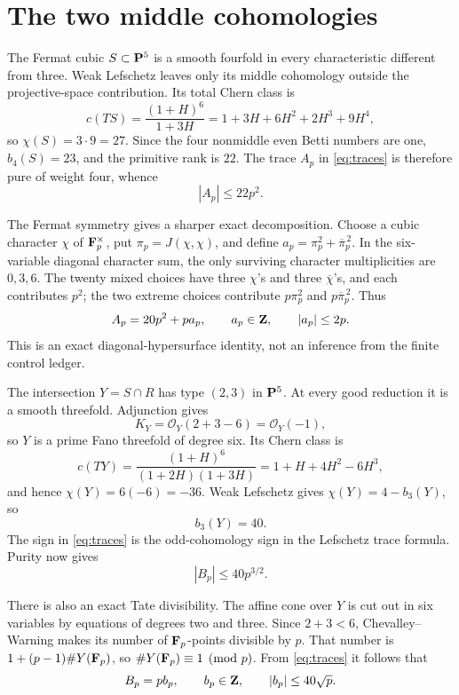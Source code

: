 \section{The two middle cohomologies}

The Fermat cubic \(S\subset\mathbf P^5\) is a smooth fourfold in every
characteristic different from three.  Weak Lefschetz leaves only its middle
cohomology outside the projective-space contribution.  Its total Chern class
is
\[
 c(TS)=\frac{(1+H)^6}{1+3H}
 =1+3H+6H^2+2H^3+9H^4,
\]
so \(\chi(S)=3\cdot9=27\).  Since the four nonmiddle even Betti numbers are
one, \(b_4(S)=23\), and the primitive rank is \(22\).  The trace \(A_p\) in
\cref{eq:traces} is therefore pure of weight four, whence
\begin{equation}\label{eq:Abound}
 |A_p|\le22p^2.
\end{equation}

The Fermat symmetry gives a sharper exact decomposition.  Choose a cubic
character \(\chi\) of \(\mathbf F_p^\times\), put
\(\pi_p=J(\chi,\chi)\), and define
\(a_p=\pi_p^2+\overline{\pi}_p^{\,2}\).  In the six-variable diagonal
character sum, the only surviving character multiplicities are
\(0,3,6\).  The twenty mixed choices have three \(\chi\)'s and three
\(\overline\chi\)'s, and each contributes \(p^2\); the two extreme choices
contribute \(p\pi_p^2\) and \(p\overline\pi_p^{\,2}\).  Thus
\begin{equation}\label{eq:Aexact}
 A_p=20p^2+pa_p,\qquad a_p\in\mathbf Z,\qquad |a_p|\le2p.
\end{equation}
This is an exact diagonal-hypersurface identity, not an inference from the
finite control ledger.

The intersection \(Y=S\cap R\) has type \((2,3)\) in \(\mathbf P^5\).  At every
good reduction it is a smooth threefold.  Adjunction gives
\[
 K_Y=\mathcal O_Y(2+3-6)=\mathcal O_Y(-1),
\]
so \(Y\) is a prime Fano threefold of degree six.  Its Chern class is
\[
 c(TY)=\frac{(1+H)^6}{(1+2H)(1+3H)}
 =1+H+4H^2-6H^3,
\]
and hence \(\chi(Y)=6(-6)=-36\).  Weak Lefschetz gives
\(\chi(Y)=4-b_3(Y)\), so
\begin{equation}\label{eq:b3}
 b_3(Y)=40.
\end{equation}
The sign in \cref{eq:traces} is the odd-cohomology sign in the Lefschetz
trace formula.  Purity now gives
\begin{equation}\label{eq:Bbound}
 |B_p|\le40p^{3/2}.
\end{equation}

There is also an exact Tate divisibility.  The affine cone over \(Y\) is cut
out in six variables by equations of degrees two and three.  Since
\(2+3<6\), Chevalley--Warning \cite{Warning1935} makes its number of
\(\mathbf F_p\)-points divisible by \(p\).  That number is
\(1+(p-1)\#Y(\mathbf F_p)\), so
\(\#Y(\mathbf F_p)\equiv1\pmod p\).  From \cref{eq:traces} it follows that
\begin{equation}\label{eq:Bexact}
 B_p=pb_p,\qquad b_p\in\mathbf Z,\qquad |b_p|\le40\sqrt p.
\end{equation}


